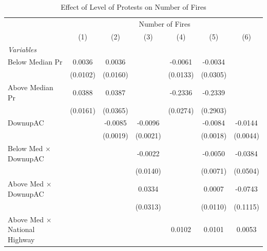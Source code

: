 
\begin{table}[htbp]
   \caption{\label{tab:protest_treat_main} Effect of Level of Protests on Number of Fires}
   \centering
   \begin{tabular}{lcccccc}
      \tabularnewline \midrule \midrule
       & \multicolumn{6}{c}{Number of Fires}\\
                                                              & (1)           & (2)           & (3)           & (4)           & (5)           & (6)\\  
      \midrule
      \emph{Variables}\\
      Below Median Pr                                         & 0.0036        & 0.0036        &               & -0.0061       & -0.0034       &   \\   
                                                              & (0.0102)      & (0.0160)      &               & (0.0133)      & (0.0305)      &   \\   
      Above Median Pr                                         & 0.0388        & 0.0387        &               & -0.2336       & -0.2339       &   \\   
                                                              & (0.0161)      & (0.0365)      &               & (0.0274)      & (0.2903)      &   \\   
      DownupAC                                                &               & -0.0085       & -0.0096       &               & -0.0084       & -0.0144\\   
                                                              &               & (0.0019)      & (0.0021)      &               & (0.0018)      & (0.0044)\\   
      Below Med $\times$ DownupAC                             &               &               & -0.0022       &               & -0.0050       & -0.0384\\   
                                                              &               &               & (0.0140)      &               & (0.0071)      & (0.0504)\\   
      Above Med $\times$ DownupAC                             &               &               & 0.0334        &               & 0.0007        & -0.0743\\   
                                                              &               &               & (0.0313)      &               & (0.0110)      & (0.1115)\\   
      Above Med $\times$ National Highway                     &               &               &               & 0.0102        & 0.0101        & 0.0053\\   

\end{tabular}
\end{table}
